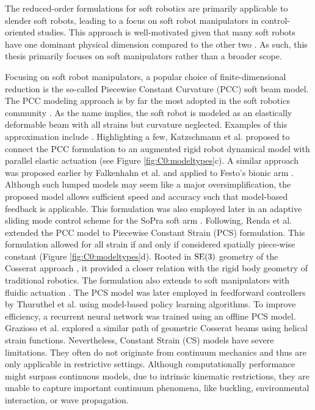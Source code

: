 %
\begin{rmk}
 The reduced-order formulations for soft robotics are primarily applicable to slender soft robots, leading to a focus on soft robot manipulators in control-oriented studies. This approach is well-motivated given that many soft robots have one dominant physical dimension compared to the other two \cite{DellaSantina2021}. As such, this thesis primarily focuses on soft manipulators rather than a broader scope.
\end{rmk}
%
\par
Focusing on soft robot manipulators, a popular choice of finite-dimensional reduction is the so-called Piecewise Constant Curvature (PCC) soft beam model. The PCC modeling approach is by far the most adopted in the soft robotics community \cite{Webster2010}. As the name implies, the soft robot is modeled as an elastically deformable beam with all strains but curvature neglected. Examples of this approximation include \cite{Falkenhahn2015,Marchese2016,Katzschmann2018,Katzschmann2019,Runge2017,Franco2020,Webster2010,DellaSantina2020a}. Highlighting a few, Katzschmann et al. \cite{Katzschmann2018} proposed to connect the PCC formulation to an augmented rigid robot dynamical model with parallel elastic actuation (see Figure \ref{fig:C0:modeltypes}c). A similar approach was proposed earlier by Falkenhahn et al. \cite{Falkenhahn2015} and applied to Festo's bionic arm \cite{Grzesiak2011}. Although such lumped models may seem like a major oversimplification, the proposed model allows sufficient speed and accuracy such that model-based feedback is applicable. This formulation was also employed later in an adaptive sliding mode control scheme \cite{Kazemipour2022May} for the SoPra soft arm \cite{Toshimitsu2021Sep}. Following, Renda et al. \cite{Renda2018} extended the PCC model to Piecewise Constant Strain (PCS) formulation. This formulation allowed for all strain if and only if considered spatially piece-wise constant (Figure \ref{fig:C0:modeltypes}d). Rooted in $\textup{\textrm{SE}}(3)$ geometry of the Cosserat approach \cite{Simo1986}, it provided a closer relation with the rigid body geometry of traditional robotics. The formulation also extends to soft manipulators with fluidic actuation \cite{Renda2017Aug, Till2019}. The PCS model was later employed in feedforward controllers by Thuruthel et al. \cite{Thuruthel2018Nov} using model-based policy learning algorithms. To improve efficiency, a recurrent neural network was trained using an offline PCS model. Grazioso et al. \cite{Grazioso2019} explored a similar path of geometric Cosserat beams using helical strain functions. Nevertheless, Constant Strain (CS) models have severe limitations. They often do not originate from continuum mechanics and thus are only applicable in restrictive settings. Although computationally performance might surpass continuous models, due to intrinsic kinematic restrictions, they are unable to capture important continuum phenomena, like buckling, environmental interaction, or wave propagation.

